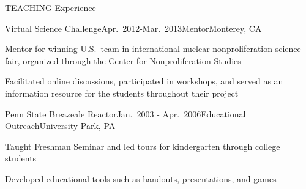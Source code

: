 \documentclass{resume2} %
\begin{document}
\begin{rSection}{TEACHING Experience}

\begin{rSubsection}{Virtual Science Challenge}{Apr.\ 2012-Mar.\ 2013}{Mentor}{Monterey, CA}
\item Mentor for winning U.S.\ team in international nuclear nonproliferation science fair, organized through the Center for Nonproliferation Studies
\item Facilitated online discussions, participated in workshops, and served as an information resource for the students throughout their project
\end{rSubsection}


\begin{rSubsection}{Penn State Breazeale Reactor}{Jan.\ 2003 - Apr.\ 2006}{Educational Outreach}{University Park, PA}
\item Taught Freshman Seminar and led tours for kindergarten through college students
\item Developed educational tools such as handouts, presentations, and games
\end{rSubsection}

\end{rSection}



\end{document}
